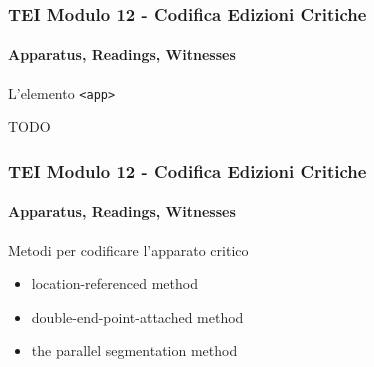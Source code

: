 \begin{frame}
    \frametitle{TEI Modulo 12 - Codifica Edizioni Critiche}
    \framesubtitle{Apparatus, Readings, Witnesses}
    \addtocounter{nframe}{1}










    \begin{block}{L'elemento \texttt{<app>}}

        TODO

    \end{block}


\end{frame}


\begin{frame}
    \frametitle{TEI Modulo 12 - Codifica Edizioni Critiche}
    \framesubtitle{Apparatus, Readings, Witnesses}
    \addtocounter{nframe}{1}


    \begin{block}{Metodi per codificare l'apparato critico}
        \begin{itemize}
            \item location-referenced method
            \item double-end-point-attached method
            \item the parallel segmentation method
        \end{itemize}

       
    \end{block}


\end{frame}


